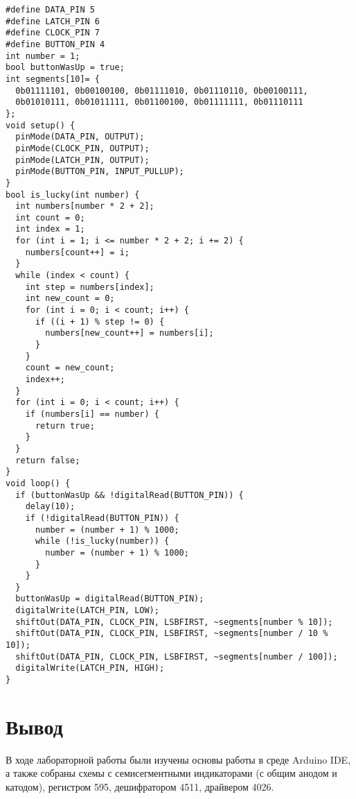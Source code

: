 \documentclass[a4paper,14pt]{extarticle}
\begin{document}
  \begingroup
    \fontsize{14pt}{10pt}\selectfont
    \linespread{1}
    \begin{verbatim}
#define DATA_PIN 5
#define LATCH_PIN 6
#define CLOCK_PIN 7
#define BUTTON_PIN 4
int number = 1;
bool buttonWasUp = true;
int segments[10]= {
  0b01111101, 0b00100100, 0b01111010, 0b01110110, 0b00100111,
  0b01010111, 0b01011111, 0b01100100, 0b01111111, 0b01110111
};
void setup() {
  pinMode(DATA_PIN, OUTPUT);
  pinMode(CLOCK_PIN, OUTPUT);
  pinMode(LATCH_PIN, OUTPUT);
  pinMode(BUTTON_PIN, INPUT_PULLUP);
}
bool is_lucky(int number) {
  int numbers[number * 2 + 2];
  int count = 0;
  int index = 1;
  for (int i = 1; i <= number * 2 + 2; i += 2) {
    numbers[count++] = i;
  }
  while (index < count) {
    int step = numbers[index];
    int new_count = 0;
    for (int i = 0; i < count; i++) {
      if ((i + 1) % step != 0) {
        numbers[new_count++] = numbers[i];
      }
    }
    count = new_count;
    index++;
  }
  for (int i = 0; i < count; i++) {
    if (numbers[i] == number) {
      return true;
    }
  }
  return false;
}
void loop() {
  if (buttonWasUp && !digitalRead(BUTTON_PIN)) {
    delay(10);
    if (!digitalRead(BUTTON_PIN)) {
      number = (number + 1) % 1000;
      while (!is_lucky(number)) {
        number = (number + 1) % 1000;
      }
    }
  }
  buttonWasUp = digitalRead(BUTTON_PIN);
  digitalWrite(LATCH_PIN, LOW);
  shiftOut(DATA_PIN, CLOCK_PIN, LSBFIRST, ~segments[number % 10]);
  shiftOut(DATA_PIN, CLOCK_PIN, LSBFIRST, ~segments[number / 10 % 10]);
  shiftOut(DATA_PIN, CLOCK_PIN, LSBFIRST, ~segments[number / 100]);
  digitalWrite(LATCH_PIN, HIGH);
}
    \end{verbatim}
  \endgroup

  \section*{\hspace{12.5mm}Вывод}
  В ходе лабораторной работы были изучены основы работы в среде Arduino IDE, а также собраны схемы с семисегментными индикаторами (с общим анодом и катодом), регистром 595, дешифратором 4511, драйвером 4026.
 
\end{document}
